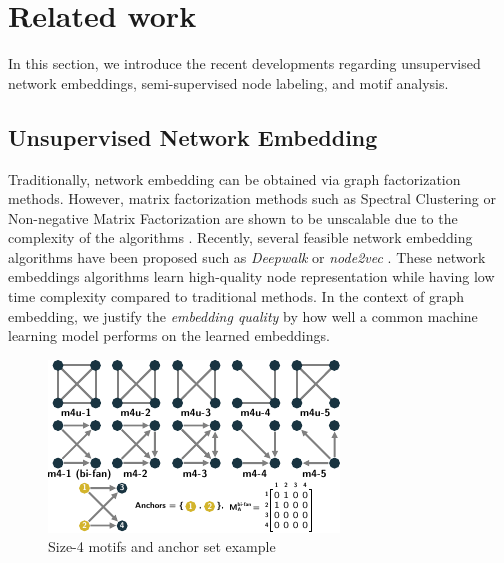 \documentclass{article}
\theoremstyle{definition}
\begin{document}
\section{Related work}

In this section, we introduce the recent developments regarding unsupervised
network embeddings, semi-supervised node labeling, and motif analysis.

\subsection{Unsupervised Network Embedding}

Traditionally, network embedding can be obtained via graph
factorization methods. However, matrix factorization methods such as
Spectral Clustering or Non-negative Matrix Factorization are
shown to be unscalable due to the complexity of the algorithms
\cite{deepwalk,eigmaps}. Recently, several feasible network
embedding algorithms have been proposed such as \emph{Deepwalk}
\cite{deepwalk} or \emph{node2vec} \cite{node2vec}. These network embeddings
algorithms learn high-quality node representation while having low time
complexity compared to traditional methods. In the context of graph embedding, we
justify the \emph{embedding quality} by how well a common machine learning model
performs on the learned embeddings.

\begin{figure}[H]
    \centering
    \includegraphics[width=0.8\linewidth]{m4}
    \caption{Size-4 motifs and anchor set example}
    \label{fig:m4}
\end{figure}
\end{document}
